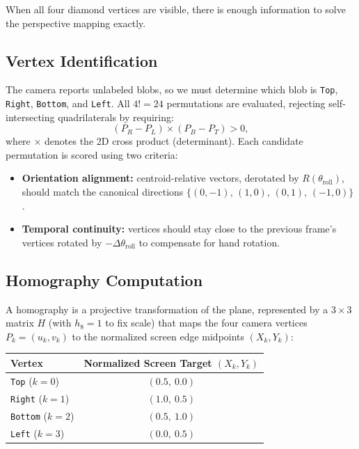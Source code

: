\documentclass[11pt,a4paper]{article}
\newcommand{\code}[1]{\texttt{#1}}
\begin{document}
When all four diamond vertices are visible, there is enough information to
solve the perspective mapping exactly.

\subsection{Vertex Identification}

The camera reports unlabeled blobs, so we must determine which blob is
\code{Top}, \code{Right}, \code{Bottom}, and \code{Left}. All $4! = 24$
permutations are evaluated, rejecting self-intersecting quadrilaterals by
requiring:
\begin{equation}
  (P_R - P_L) \times (P_B - P_T) > 0 ,
\end{equation}
where $\times$ denotes the 2D cross product (determinant). Each candidate
permutation is scored using two criteria:
\begin{itemize}[nosep]
  \item \textbf{Orientation alignment:} centroid-relative vectors, derotated by
        $R(\theta_{\text{roll}})$, should match the canonical directions
        $\{(0,-1),\,(1,0),\,(0,1),\,(-1,0)\}$.
  \item \textbf{Temporal continuity:} vertices should stay close to the
        previous frame's vertices rotated by $-\Delta\theta_{\text{roll}}$ to
        compensate for hand rotation.
\end{itemize}

\subsection{Homography Computation}

A homography is a projective transformation of the plane, represented by a
$3\times 3$ matrix $H$ (with $h_8 = 1$ to fix scale) that maps the four
camera vertices $P_k = (u_k, v_k)$ to the normalized screen edge midpoints
$(X_k, Y_k)$:

\begin{center}
\begin{tabular}{lc}
\toprule
Vertex & Normalized Screen Target $(X_k, Y_k)$ \\
\midrule
\code{Top}    ($k=0$) & $(0.5,\ 0.0)$ \\
\code{Right}  ($k=1$) & $(1.0,\ 0.5)$ \\
\code{Bottom} ($k=2$) & $(0.5,\ 1.0)$ \\
\code{Left}   ($k=3$) & $(0.0,\ 0.5)$ \\
\bottomrule
\end{tabular}
\end{center}
\end{document}
